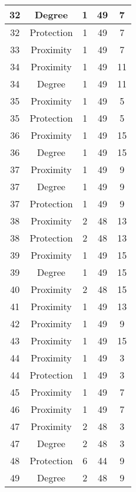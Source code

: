 \documentclass[results.tex]{subfiles}
\begin{document}
\begin{center}
\begin{tabular}{| c || c | c | c | c |}
    \hline
    32 & Degree & 1 & 49 & 7 \\ 
    \hline
    32 & Protection & 1 & 49 & 7 \\ 
    \hline
    33 & Proximity & 1 & 49 & 7 \\ 
    \hline
    34 & Proximity & 1 & 49 & 11 \\ 
    \hline
    34 & Degree & 1 & 49 & 11 \\ 
    \hline
    35 & Proximity & 1 & 49 & 5 \\ 
    \hline
    35 & Protection & 1 & 49 & 5 \\ 
    \hline
    36 & Proximity & 1 & 49 & 15 \\ 
    \hline
    36 & Degree & 1 & 49 & 15 \\ 
    \hline
    37 & Proximity & 1 & 49 & 9 \\ 
    \hline
    37 & Degree & 1 & 49 & 9 \\ 
    \hline
    37 & Protection & 1 & 49 & 9 \\ 
    \hline
    38 & Proximity & 2 & 48 & 13 \\ 
    \hline
    38 & Protection & 2 & 48 & 13 \\ 
    \hline
    39 & Proximity & 1 & 49 & 15 \\ 
    \hline
    39 & Degree & 1 & 49 & 15 \\ 
    \hline
    40 & Proximity & 2 & 48 & 15 \\ 
    \hline
    41 & Proximity & 1 & 49 & 13 \\ 
    \hline
    42 & Proximity & 1 & 49 & 9 \\ 
    \hline
    43 & Proximity & 1 & 49 & 15 \\ 
    \hline
    44 & Proximity & 1 & 49 & 3 \\ 
    \hline
    44 & Protection & 1 & 49 & 3 \\ 
    \hline
    45 & Proximity & 1 & 49 & 7 \\ 
    \hline
    46 & Proximity & 1 & 49 & 7 \\ 
    \hline
    47 & Proximity & 2 & 48 & 3 \\ 
    \hline
    47 & Degree & 2 & 48 & 3 \\ 
    \hline
    48 & Protection & 6 & 44 & 9 \\ 
    \hline
    49 & Degree & 2 & 48 & 9 \\ 
    \hline   \end{tabular}
\end{center}
\end{document}

